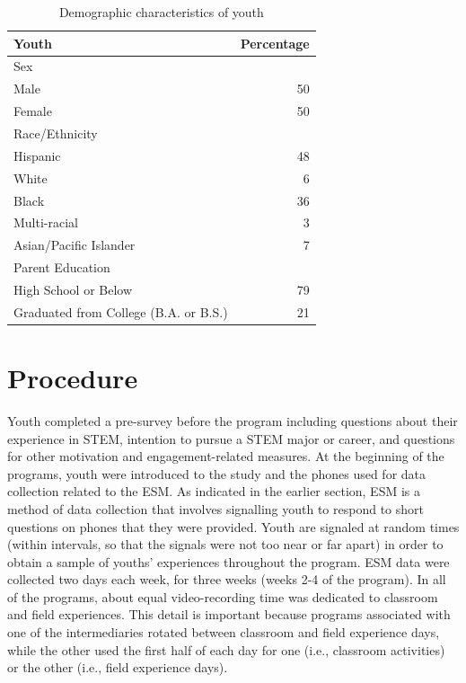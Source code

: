 \documentclass[]{msu-thesis}
\theoremstyle{definition}
\theoremstyle{definition}
\theoremstyle{definition}
\theoremstyle{remark}
\begin{document}
\begin{table}

\caption{\label{tab:unnamed-chunk-3}Demographic characteristics of youth}
\centering
\begin{tabular}[t]{lr}
\toprule
Youth & Percentage\\
\midrule
Sex & \\
Male & 50\\
Female & 50\\
Race/Ethnicity & \\
Hispanic & 48\\
\addlinespace
White & 6\\
Black & 36\\
Multi-racial & 3\\
Asian/Pacific Islander & 7\\
Parent Education & \\
\addlinespace
High School or Below & 79\\
Graduated from College (B.A. or B.S.) & 21\\
\bottomrule
\end{tabular}
\end{table}

\section{Procedure}\label{procedure}

Youth completed a pre-survey before the program including questions
about their experience in STEM, intention to pursue a STEM major or
career, and questions for other motivation and engagement-related
measures. At the beginning of the programs, youth were introduced to the
study and the phones used for data collection related to the ESM. As
indicated in the earlier section, ESM is a method of data collection
that involves signalling youth to respond to short questions on phones
that they were provided. Youth are signaled at random times (within
intervals, so that the signals were not too near or far apart) in order
to obtain a sample of youths' experiences throughout the program. ESM
data were collected two days each week, for three weeks (weeks 2-4 of
the program). In all of the programs, about equal video-recording time
was dedicated to classroom and field experiences. This detail is
important because programs associated with one of the intermediaries
rotated between classroom and field experience days, while the other
used the first half of each day for one (i.e., classroom activities) or
the other (i.e., field experience days).
\end{document}
